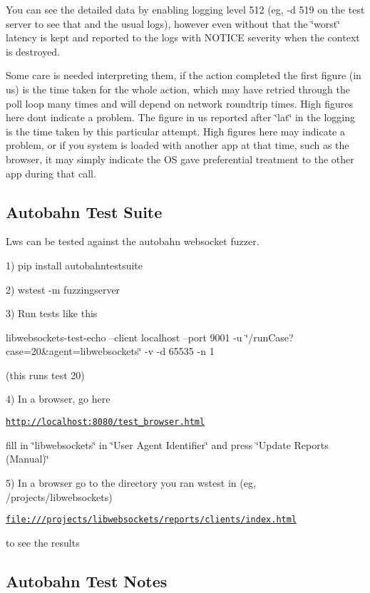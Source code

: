 You can see the detailed data by enabling logging level 512 (eg, {\ttfamily -\/d 519} on the test server to see that and the usual logs), however even without that the \char`\"{}worst\char`\"{} latency is kept and reported to the logs with N\+O\+T\+I\+CE severity when the context is destroyed.

Some care is needed interpreting them, if the action completed the first figure (in us) is the time taken for the whole action, which may have retried through the poll loop many times and will depend on network roundtrip times. High figures here don\textquotesingle{}t indicate a problem. The figure in us reported after \char`\"{}lat\char`\"{} in the logging is the time taken by this particular attempt. High figures here may indicate a problem, or if you system is loaded with another app at that time, such as the browser, it may simply indicate the OS gave preferential treatment to the other app during that call.

\subsection*{Autobahn Test Suite }

Lws can be tested against the autobahn websocket fuzzer.

1) pip install autobahntestsuite

2) wstest -\/m fuzzingserver

3) Run tests like this

libwebsockets-\/test-\/echo --client localhost --port 9001 -\/u \char`\"{}/run\+Case?case=20\&agent=libwebsockets\char`\"{} -\/v -\/d 65535 -\/n 1

(this runs test 20)

4) In a browser, go here

\href{http://localhost:8080/test_browser.html}{\tt http\+://localhost\+:8080/test\+\_\+browser.\+html}

fill in \char`\"{}libwebsockets\char`\"{} in \char`\"{}\+User Agent Identifier\char`\"{} and press \char`\"{}\+Update Reports (\+Manual)\char`\"{}

5) In a browser go to the directory you ran wstest in (eg, /projects/libwebsockets)

\href{file:///projects/libwebsockets/reports/clients/index.html}{\tt file\+:///projects/libwebsockets/reports/clients/index.\+html}

to see the results

\subsection*{Autobahn Test Notes }

